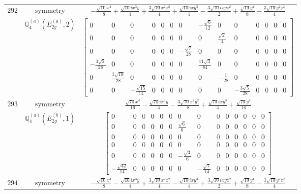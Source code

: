 \documentclass[fleqn,8pt,landscape]{jsarticle}
\begin{document}
\begin{longtable}{ccc}
$ 292 $ & $ \text{symmetry} $ & $ - \frac{\sqrt{10} x^{4}}{8} + \frac{\sqrt{10} i x^{3} y}{4} + \frac{3 \sqrt{10} x^{2} z^{2}}{4} + \frac{\sqrt{10} i x y^{3}}{4} - \frac{3 \sqrt{10} i x y z^{2}}{2} + \frac{\sqrt{10} y^{4}}{8} - \frac{3 \sqrt{10} y^{2} z^{2}}{4} $ \\
$  $ & $ \mathbb{Q}_{4}^{(a)}(E_{2g}^{(a)},2) $ & $ \begin{bmatrix} 0 & 0 & 0 & 0 & 0 & 0 & 0 & - \frac{\sqrt{6}}{12} & 0 & 0 & 0 & 0 & 0 & 0 \\ 0 & 0 & 0 & 0 & 0 & 0 & 0 & 0 & \frac{\sqrt{2}}{4} & 0 & 0 & 0 & 0 & 0 \\ 0 & 0 & 0 & 0 & 0 & 0 & - \frac{\sqrt{7}}{28} & 0 & 0 & 0 & 0 & 0 & 0 & 0 \\ - \frac{3 \sqrt{2}}{28} & 0 & 0 & 0 & 0 & 0 & 0 & \frac{11 \sqrt{3}}{84} & 0 & 0 & 0 & 0 & 0 & 0 \\ 0 & \frac{3 \sqrt{10}}{28} & 0 & 0 & 0 & 0 & 0 & 0 & - \frac{1}{28} & 0 & 0 & 0 & 0 & 0 \\ 0 & 0 & - \frac{\sqrt{15}}{14} & 0 & 0 & 0 & 0 & 0 & 0 & - \frac{3 \sqrt{5}}{28} & 0 & 0 & 0 & 0 \end{bmatrix} $ \\ \hline
$ 293 $ & $ \text{symmetry} $ & $ \frac{\sqrt{70} x^{4}}{16} - \frac{\sqrt{70} i x^{3} y}{4} - \frac{3 \sqrt{70} x^{2} y^{2}}{8} + \frac{\sqrt{70} i x y^{3}}{4} + \frac{\sqrt{70} y^{4}}{16} $ \\
$  $ & $ \mathbb{Q}_{4}^{(a)}(E_{2g}^{(b)},1) $ & $ \begin{bmatrix} 0 & 0 & 0 & 0 & 0 & 0 & 0 & 0 & 0 & 0 & 0 & 0 & 0 & 0 \\ 0 & 0 & 0 & 0 & 0 & 0 & \frac{\sqrt{6}}{6} & 0 & 0 & 0 & 0 & 0 & 0 & 0 \\ 0 & 0 & 0 & 0 & 0 & 0 & 0 & 0 & 0 & 0 & 0 & 0 & 0 & 0 \\ 0 & 0 & 0 & 0 & 0 & 0 & 0 & 0 & 0 & 0 & 0 & 0 & 0 & 0 \\ 0 & 0 & 0 & 0 & 0 & 0 & - \frac{\sqrt{3}}{6} & 0 & 0 & 0 & 0 & 0 & 0 & 0 \\ - \frac{\sqrt{42}}{14} & 0 & 0 & 0 & 0 & 0 & 0 & - \frac{\sqrt{7}}{14} & 0 & 0 & 0 & 0 & 0 & 0 \end{bmatrix} $ \\ \hline
$ 294 $ & $ \text{symmetry} $ & $ - \frac{\sqrt{10} x^{4}}{8} - \frac{\sqrt{10} i x^{3} y}{4} + \frac{3 \sqrt{10} x^{2} z^{2}}{4} - \frac{\sqrt{10} i x y^{3}}{4} + \frac{3 \sqrt{10} i x y z^{2}}{2} + \frac{\sqrt{10} y^{4}}{8} - \frac{3 \sqrt{10} y^{2} z^{2}}{4} $ \\

\end{longtable}
\end{document}
